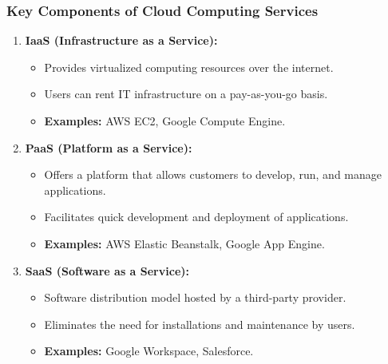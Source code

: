 \documentclass[aspectratio=169]{beamer}
\begin{document}
\begin{frame}[fragile]
  \frametitle{Key Components of Cloud Computing Services}
  \begin{enumerate}
    \item \textbf{IaaS (Infrastructure as a Service):} 
      \begin{itemize}
        \item Provides virtualized computing resources over the internet.
        \item Users can rent IT infrastructure on a pay-as-you-go basis.
        \item \textbf{Examples:} AWS EC2, Google Compute Engine.
      \end{itemize}
      
    \item \textbf{PaaS (Platform as a Service):} 
      \begin{itemize}
        \item Offers a platform that allows customers to develop, run, and manage applications.
        \item Facilitates quick development and deployment of applications.
        \item \textbf{Examples:} AWS Elastic Beanstalk, Google App Engine.
      \end{itemize}
      
    \item \textbf{SaaS (Software as a Service):} 
      \begin{itemize}
        \item Software distribution model hosted by a third-party provider.
        \item Eliminates the need for installations and maintenance by users.
        \item \textbf{Examples:} Google Workspace, Salesforce.
      \end{itemize}
  \end{enumerate}
\end{frame}
\end{document}

